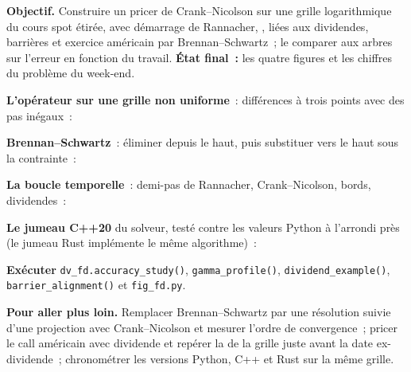 \begin{tutorial}
\textbf{Objectif.} Construire un pricer de Crank--Nicolson sur une grille logarithmique du cours spot étirée, avec démarrage de Rannacher, ,  liées aux dividendes,
barrières et exercice américain par Brennan--Schwartz~; le comparer aux arbres sur l'erreur en fonction du travail. \textbf{État final~:} les quatre
figures et les chiffres du problème du week-end.
\begin{tutsteps}
\item \textbf{L'opérateur sur une grille non uniforme}~: différences à trois points avec des pas inégaux~:
\label{lst:dv:trees-and-finite-difference-pricers-in-practice:operator}
\item \textbf{Brennan--Schwartz}~: éliminer depuis le haut, puis substituer vers le haut sous la contrainte~:
\label{lst:dv:trees-and-finite-difference-pricers-in-practice:bs}
\item \textbf{La boucle temporelle}~: demi-pas de Rannacher, Crank--Nicolson, bords, dividendes~:
\label{lst:dv:trees-and-finite-difference-pricers-in-practice:loop}
\item \textbf{Le jumeau C++20} du solveur, testé contre les valeurs Python à l'arrondi près (le jumeau Rust implémente le même algorithme)~:
\label{lst:dv:trees-and-finite-difference-pricers-in-practice:cpp}
\item \textbf{Exécuter} \texttt{dv\_fd.accuracy\_study()}, \texttt{gamma\_profile()}, \texttt{dividend\_example()}, \texttt{barrier\_alignment()} et
\texttt{fig\_fd.py}.
\end{tutsteps}
\textbf{Pour aller plus loin.} Remplacer Brennan--Schwartz par une résolution suivie d'une projection avec Crank--Nicolson et mesurer l'ordre de convergence~; pricer le
call américain avec dividende et repérer la  de la grille juste avant la date ex-dividende~; chronométrer les versions Python, C++ et Rust sur la même
grille.
\end{tutorial}

